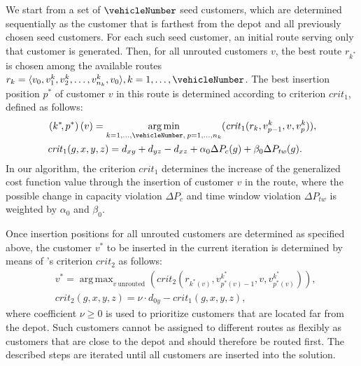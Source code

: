 \documentclass[11pt,a4paper,fleqn]{article}
\DeclareMathOperator*{\argmin}{arg\,min}
\DeclareMathOperator*{\argmax}{arg\,max}
\begin{document}
We start from a set of $\vehicleNumber$ seed customers, which are determined sequentially as the customer that is farthest from the depot and all previously chosen seed customers. For each such seed customer, an initial route serving only that customer is generated. Then, for all unrouted customers $v$, the best route $r_{k^*}$ is chosen among the available routes $r_k = \langle v_0, v^k_1, v^k_2, \ldots, v^k_{n_k},v_{0} \rangle, k = 1, \dotsc, \vehicleNumber$. The best insertion position $p^*$ of customer $v$ in this route is determined according to criterion $\mathit{crit}_1$,  defined as follows: 
\begin{align*}
  & \left(k^*\!,p^*\right)(v) = \argmin_{k = 1, \dotsc, \vehicleNumber,\: p = 1, \ldots, n_k} (\mathit{crit}_1(r_k,v^k_{p-1},v,v^k_p))\mathrm{,}\\
  & \mathit{crit}_1(g,x,y,z) = d_{xy}+d_{yz}-d_{xz} + \alpha_0 \Delta P_c(g) + \beta_0 \Delta P_{\mathit{tw}}(g). 
\end{align*}
In our algorithm, the criterion $\mathit{crit}_1$  determines the increase of the generalized cost function value through the insertion of customer $v$ in the route, where the possible change in capacity violation $\Delta P_c$ and time window violation $\Delta P_{\mathit{tw}}$ is weighted by $\alpha_0$ and $\beta_0$.

Once insertion positions for all unrouted customers are determined as specified above, the customer  $v^*$ to be inserted in the current iteration is determined by means of  \citeauthor{solomon:87}'s criterion $\mathit{crit}_2$ as follows:
\begin{align*}
  & v^* = \argmax_{v \: \text{unrouted}} \left (\mathit{crit}_2(r_{k^*\!(v)},v^{k^*}_{p^*\!(v)-1},v,v^{k^*}_{p^*\!(v)}) \right),\\
  & \mathit{crit}_2(g,x,y,z) = \nu \cdot  d_{0y} - \mathit{crit}_1(g,x,y,z), %
\end{align*}
where coefficient $\nu \geq 0$ is used to prioritize customers that are located far from the depot. Such customers cannot be assigned to different routes as flexibly as customers that are close to the depot and should therefore be routed first. The described steps are iterated until all customers are inserted into the solution.
\end{document}
